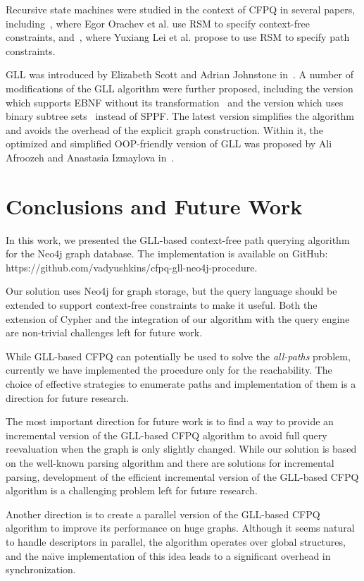 \documentclass[
11pt,%
tightenlines,%
twoside,%
onecolumn,%
nobibnotes,%
nofootinbib,%
superscriptaddress,%
noshowpacs,%
longbibliography,%
centertags]%
{revtex4-2}
\begin{document}
Recursive state machines were studied in the context of CFPQ in several papers, including~\cite{OrachevKronecker}, where Egor Orachev et al. use RSM to specify context-free constraints, and~\cite{10.1145/3591233}, where Yuxiang Lei et al. propose to use RSM to specify path constraints.

GLL was introduced by Elizabeth Scott and Adrian Johnstone in~\cite{SCOTT2010177}. A number of modifications of the GLL algorithm were further proposed, including the version which supports EBNF without its transformation~\cite{SCOTT2018120} and the version which uses binary subtree sets~\cite{SCOTT201963} instead of SPPF. The latest version simplifies the algorithm and avoids the overhead of the explicit graph construction. Within it, the optimized and simplified OOP-friendly version of GLL was proposed by Ali Afroozeh and Anastasia Izmaylova in~\cite{AfroozenFasterGll}.


\section{Conclusions and Future Work}\label{section:conclusion}

In this work, we presented the GLL-based context-free path querying algorithm for the Neo4j graph database. The implementation is available on GitHub: {https://github.com/vadyushkins/cfpq-gll-neo4j-procedure}.

Our solution uses Neo4j for graph storage, but the query language should be extended to support context-free constraints to make it useful. Both the extension of Cypher and the integration of our algorithm with the query engine are non-trivial challenges left for future work.

While GLL-based CFPQ can potentially be used to solve the \textit{all-paths} problem, currently we have implemented the procedure only for the reachability. The choice of effective strategies to enumerate paths and implementation of them is a direction for future research.  

The most important direction for future work is to find a way to provide an incremental version of the GLL-based CFPQ algorithm to avoid full query reevaluation when the graph is only slightly changed. While our solution is based on the well-known parsing algorithm and there are solutions for incremental parsing, development of the efficient incremental version of the GLL-based CFPQ algorithm is a challenging problem left for future research. 

Another direction is to create a parallel version of the GLL-based CFPQ algorithm to improve its performance on huge graphs. Although it seems natural to handle descriptors in parallel, the algorithm operates over global structures, and the na{\"{\i}}ve implementation of this idea leads to a significant overhead in synchronization.
\end{document}
